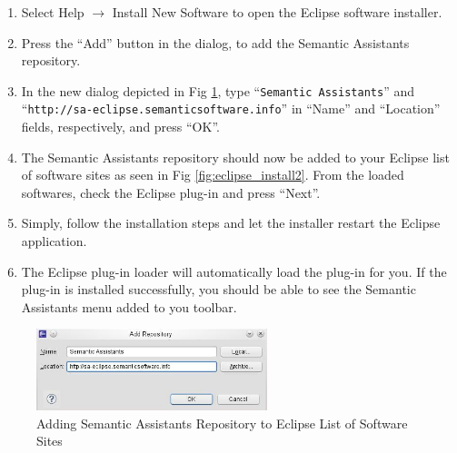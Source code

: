 \begin{enumerate}
  \item Select Help $\rightarrow$ Install New Software to open the Eclipse software installer.
  \item Press the ``Add'' button in the dialog, to add the Semantic Assistants repository.
  \item In the new dialog depicted in Fig \ref{fig:eclipse_install}, type ``\texttt{Semantic Assistants}'' and\\ ``\texttt{http://sa-eclipse.semanticsoftware.info}'' in ``Name'' and ``Location'' fields, respectively, and press ``OK''.
  \item The Semantic Assistants repository should now be added to your Eclipse list of software sites as seen in Fig \ref{fig:eclipse_install2}. From the loaded softwares, check the Eclipse plug-in and press ``Next''.
  \item Simply, follow the installation steps and let the installer restart the Eclipse application.
  \item The Eclipse plug-in loader will automatically load the plug-in for you. If the plug-in is installed
successfully, you should be able to see the Semantic Assistants menu added to
you toolbar.
\end{enumerate}

\begin{figure}[htb]
\begin{center}
  \includegraphics[width=0.6\textwidth]{pictures/eclipse_install.jpg}
  \caption{Adding Semantic Assistants Repository to Eclipse List of Software Sites}
  \label{fig:eclipse_install}
\end{center}
\end{figure}

